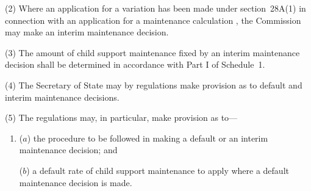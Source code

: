 \documentclass[12pt,a4paper]{article}
\begin{document}
(2) Where an application for a variation has been made under section~28A(1)  in connection with an application for a maintenance calculation%
, the 
Commission  %
may make an interim maintenance decision.

(3) The amount of child support maintenance fixed by an interim maintenance decision shall be determined in accordance with Part I of Schedule~1. 

(4) The Secretary of State may by regulations make provision as to default and interim maintenance decisions.

(5) The regulations may, in particular, make provision as to—
\begin{enumerate}\item[]
($a$) the procedure to be followed in making a default or an interim maintenance decision; and

($b$) a default rate of child support maintenance to apply where a default maintenance decision is made.
\end{enumerate}

\end{document}
